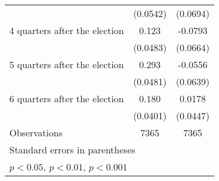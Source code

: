 \begin{table}[htbp]
\begin{tabular}{l*{2}{c}}
                    &    (0.0542)         &    (0.0694)         \\
[1em]
 4 quarters after the election&       0.123\sym{*}  &     -0.0793         \\
                    &    (0.0483)         &    (0.0664)         \\
[1em]
 5 quarters after the election&       0.293\sym{***}&     -0.0556         \\
                    &    (0.0481)         &    (0.0639)         \\
[1em]
 6 quarters after the election&       0.180\sym{***}&      0.0178         \\
                    &    (0.0401)         &    (0.0447)         \\
\hline
Observations        &        7365         &        7365         \\
\hline\hline
\multicolumn{3}{l}{\footnotesize Standard errors in parentheses}\\
\multicolumn{3}{l}{\footnotesize \sym{*} \(p<0.05\), \sym{**} \(p<0.01\), \sym{***} \(p<0.001\)}\\
\end{tabular}
\end{table}
